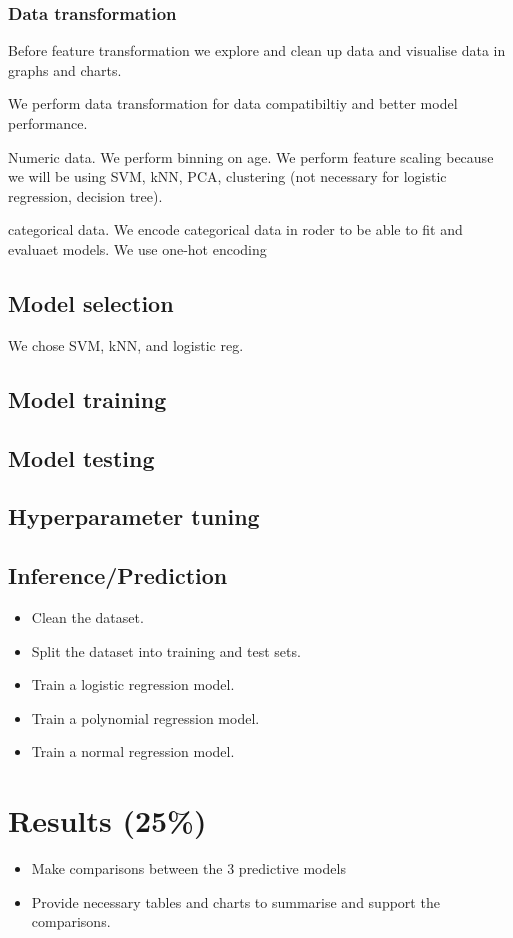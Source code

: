 \documentclass[twoside,11pt]{article}
\begin{document}
\subsubsection{Data transformation}
Before feature transformation we explore and clean up data and visualise data in graphs and charts.

We perform data transformation for data compatibiltiy and better model performance.

Numeric data. We perform binning on age. We perform feature scaling because we will be using SVM, kNN, PCA, clustering (not necessary for logistic regression, decision tree). 

categorical data. We encode categorical data in roder to be able to fit and evaluaet models. We use one-hot encoding

\subsection{Model selection}
We chose SVM, kNN, and logistic reg.

\subsection{Model training}
\subsection{Model testing}
\subsection{Hyperparameter tuning}
\subsection{Inference/Prediction}
\begin{itemize}
    \item Clean the dataset.
    \item Split the dataset into training and test sets.
    \item Train a logistic regression model.
    \item Train a polynomial regression model.
    \item Train a normal regression model.
\end{itemize}

\section{Results (25\%)}
\begin{itemize}
    \item Make comparisons between the 3 predictive models
    \item Provide necessary tables and charts to summarise and support the comparisons.
\end{itemize}
\end{document}
